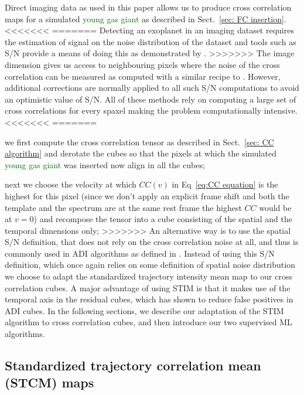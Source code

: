 \documentclass{aa}
\newcommand{\newchange}[1]{\textcolor{darkgreen}{#1}}
\begin{document}
{Direct imaging data as used in this paper allows us to produce cross correlation maps for a simulated \newchange{young gas giant} as described in Sect.~\ref{sec: FC insertion}.
<<<<<<<
=======
Detecting an exoplanet in an imaging dataset requires the estimation of signal on the noise distribution of the dataset and tools such as S/N provide a means of doing this as demonstrated by \citet{2014MawetSNR}.
>>>>>>>
The image dimension gives us access to neighbouring pixels where the noise of the cross correlation can be measured as computed with a similar recipe to \citet{2022Patapis}.
However, additional corrections are normally applied to all such S/N computations to avoid an optimistic value of S/N.
All of these methods rely on computing a large set of cross correlations for every spaxel making the problem computationally intensive.
<<<<<<<
=======
    \item we first compute the cross correlation tensor as described in Sect.~\ref{sec: CC algorithm} and derotate the cubes so that the pixels at which the simulated \newchange{young gas giant} was inserted now align in all the cubes;
    \item next we choose the velocity at which $CC(v)$ in Eq~\ref{eq:CC equation} is the highest for this pixel (since we don't apply an explicit frame shift and both the template and the spectrum are at the same rest frame the highest $CC$ would be at $v=0$) and recompose the tensor into a cube consisting of the spatial and the temporal dimensions only;
>>>>>>>
An alternative way is to use the spatial S/N definition, that does not rely on the cross correlation noise at all, and thus is commonly used in ADI algorithms as defined in \citet{2014MawetSNR}.
Instead of using this S/N definition, which once again relies on some definition of spatial noise distribution we choose to adapt the standardized trajectory intensity mean \citep[STIM,][]{2019Pairet} map to our cross correlation cubes. 
A major advantage of using STIM is that it makes use of the temporal axis in the residual cubes, which has shown to reduce false positives in ADI cubes.
In the following sections, we describe our adaptation of the STIM algorithm to cross correlation cubes, and then introduce our two supervised ML algorithms.

\subsection{Standardized trajectory correlation mean (STCM) maps}

}
\end{document}
